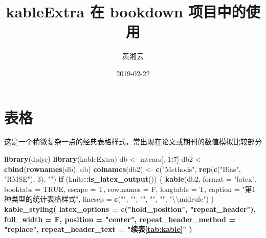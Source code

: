 \documentclass[]{book}
\title{kableExtra 在 bookdown 项目中的使用}
\author{黄湘云}
\date{2019-02-22}
\newenvironment{Shaded}{\begin{snugshade}}{\end{snugshade}}
\newcommand{\CharTok}[1]{\textcolor[rgb]{0.31,0.60,0.02}{#1}}
\newcommand{\ControlFlowTok}[1]{\textcolor[rgb]{0.13,0.29,0.53}{\textbf{#1}}}
\newcommand{\DataTypeTok}[1]{\textcolor[rgb]{0.13,0.29,0.53}{#1}}
\newcommand{\DecValTok}[1]{\textcolor[rgb]{0.00,0.00,0.81}{#1}}
\newcommand{\KeywordTok}[1]{\textcolor[rgb]{0.13,0.29,0.53}{\textbf{#1}}}
\newcommand{\NormalTok}[1]{#1}
\newcommand{\OperatorTok}[1]{\textcolor[rgb]{0.81,0.36,0.00}{\textbf{#1}}}
\newcommand{\OtherTok}[1]{\textcolor[rgb]{0.56,0.35,0.01}{#1}}
\newcommand{\StringTok}[1]{\textcolor[rgb]{0.31,0.60,0.02}{#1}}
\begin{document}
\maketitle

{
\hypersetup{linkcolor=black}
\setcounter{tocdepth}{1}
\tableofcontents
}
\hypertarget{table}{%
\chapter{表格}\label{table}}

这是一个稍微复杂一点的经典表格样式，常出现在论文或期刊的数值模拟比较部分

\begin{Shaded}
\begin{Highlighting}[]
\KeywordTok{library}\NormalTok{(dplyr)}
\KeywordTok{library}\NormalTok{(kableExtra)}
\NormalTok{db <-}\StringTok{ }\NormalTok{mtcars[, }\DecValTok{1}\OperatorTok{:}\DecValTok{7}\NormalTok{]}
\NormalTok{db2 <-}\StringTok{ }\KeywordTok{cbind}\NormalTok{(}\KeywordTok{rownames}\NormalTok{(db), db)}
\KeywordTok{colnames}\NormalTok{(db2) <-}\StringTok{ }\KeywordTok{c}\NormalTok{(}\StringTok{"Methods"}\NormalTok{, }\KeywordTok{rep}\NormalTok{(}\KeywordTok{c}\NormalTok{(}\StringTok{"Bias"}\NormalTok{, }\StringTok{"RMSE"}\NormalTok{), }\DecValTok{3}\NormalTok{), }\StringTok{""}\NormalTok{)}
\ControlFlowTok{if}\NormalTok{ (knitr}\OperatorTok{::}\KeywordTok{is_latex_output}\NormalTok{()) \{}
  \KeywordTok{kable}\NormalTok{(db2,}
    \DataTypeTok{format =} \StringTok{"latex"}\NormalTok{, }\DataTypeTok{booktabs =} \OtherTok{TRUE}\NormalTok{, }\DataTypeTok{escape =}\NormalTok{ T, }\DataTypeTok{row.names =}\NormalTok{ F,}
    \DataTypeTok{longtable =}\NormalTok{ T, }\DataTypeTok{caption =} \StringTok{"第1种类型的统计表格样式"}\NormalTok{,}
    \DataTypeTok{linesep =} \KeywordTok{c}\NormalTok{(}\StringTok{""}\NormalTok{, }\StringTok{""}\NormalTok{, }\StringTok{""}\NormalTok{, }\StringTok{""}\NormalTok{, }\StringTok{""}\NormalTok{, }\StringTok{"}\CharTok{\textbackslash{}\textbackslash{}}\StringTok{midrule"}\NormalTok{)}
\NormalTok{  ) }\OperatorTok{%>%}
\StringTok{    }\KeywordTok{kable_styling}\NormalTok{(}
      \DataTypeTok{latex_options =} \KeywordTok{c}\NormalTok{(}\StringTok{"hold_position"}\NormalTok{, }\StringTok{"repeat_header"}\NormalTok{),}
      \DataTypeTok{full_width =}\NormalTok{ F, }\DataTypeTok{position =} \StringTok{"center"}\NormalTok{, }\DataTypeTok{repeat_header_method =} \StringTok{"replace"}\NormalTok{,}
      \DataTypeTok{repeat_header_text =} \StringTok{"续表\ref{tab:kable}"}
\NormalTok{    ) }\OperatorTok{%>%}
}}
\end{Highlighting}
\end{Shaded}
\end{document}
